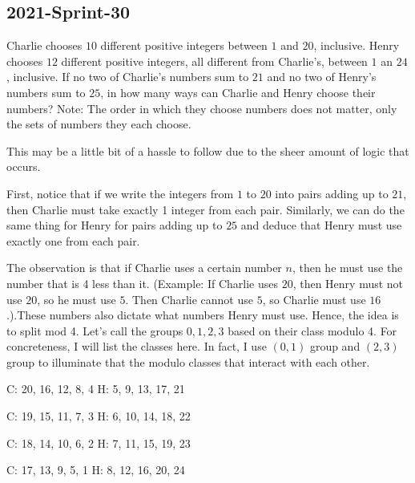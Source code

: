 \documentclass[12pt]{article}
\begin{document}
\subsection*{2021-Sprint-30}
Charlie chooses $10$ different positive integers between $1$ and $20$, inclusive. Henry chooses $12$ different positive integers, all different from Charlie's, between $1$ an $24$, inclusive. If no two of Charlie's numbers sum to $21$ and no two of Henry's numbers sum to $25$, in how many ways can Charlie and Henry choose their numbers? Note: The order in which they choose numbers does not matter, only the sets of numbers they each choose.
\begin{answer}
This may be a little bit of a hassle to follow due to the sheer amount of logic that occurs.

First, notice that if we write the integers from $1$ to $20$ into pairs adding up to $21$, then Charlie must take exactly 1 integer from each pair. Similarly, we can do the same thing for Henry for pairs adding up to $25$ and deduce that Henry must use exactly one from each pair.

The observation is that if Charlie uses a certain number $n$, then he must use the number that is 4 less than it. (Example: If Charlie uses $20$, then Henry must not use $20$, so he must use $5$. Then Charlie cannot use $5$, so Charlie must use $16$.).These numbers also dictate what numbers Henry must use. Hence, the idea is to split mod 4. Let's call the groups $0, 1, 2, 3$ based on their class modulo 4. For concreteness, I will list the classes here. In fact, I use $(0, 1)$ group and $(2, 3)$ group to illuminate that the modulo classes that interact with each other.

C: 20, 16, 12, 8, 4
H: 5, 9, 13, 17, 21

C: 19, 15, 11, 7, 3
H: 6, 10, 14, 18, 22

C: 18, 14, 10, 6, 2
H: 7, 11, 15, 19, 23

C: 17, 13, 9, 5, 1
H: 8, 12, 16, 20, 24


\end{answer}
\end{document}
